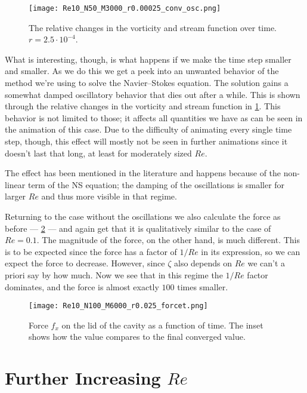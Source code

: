 \documentclass[10pt,a4paper,twocolumn]{article}
\begin{document}
\begin{figure}[!h]
    \centering
    \texttt{[image: Re10\_N50\_M3000\_r0.00025\_conv\_osc.png]}
    \caption{The relative changes in the vorticity and stream function over time. $r=2.5 \cdot 10^{-4}$.}
    \label{fig:Re10_conv_osc}
\end{figure}

What is interesting, though, is what happens if we make the time step smaller and smaller. As we do this we get a peek into an unwanted behavior of the method we're using to solve the Navier--Stokes equation. The solution gains a somewhat damped oscillatory behavior that dies out after a while. This is shown through the relative changes in the vorticity and stream function in \cref{fig:Re10_conv_osc}. This behavior is not limited to those; it affects all quantities we have as can be seen in the animation of this case. Due to the difficulty of animating every single time step, though, this effect will mostly not be seen in further animations since it doesn't last that long, at least for moderately sized $Re$.

The effect has been mentioned in the literature and happens because of the non-linear term of the NS equation; the damping of the oscillations is smaller for larger $Re$ and thus more visible in that regime. \cite{weakcite_osc}

Returning to the case without the oscillations we also calculate the force as before --- \cref{fig:Re10_forcet} --- and again get that it is qualitatively similar to the case of $Re=0.1$. The magnitude of the force, on the other hand, is much different. This is to be expected since the force has a factor of $1/Re$ in its expression, so we can expect the force to decrease. However, since $\zeta$ also depends on $Re$ we can't a priori say by how much. Now we see that in this regime the $1/Re$ factor dominates, and the force is almost exactly $100$ times smaller.

\begin{figure}[!h]
    \centering
    \texttt{[image: Re10\_N100\_M6000\_r0.025\_forcet.png]}
    \caption{Force $f_x$ on the lid of the cavity as a function of time. The inset shows how the value compares to the final converged value.}
    \label{fig:Re10_forcet}
\end{figure}

\section{Further Increasing \texorpdfstring{$Re$}{Re}}
\end{document}
